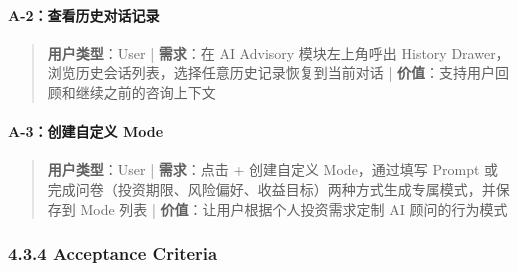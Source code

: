 
\paragraph{A-2：查看历史对话记录}

\begin{quote}\small \textbf{用户类型}：User | \textbf{需求}：在 AI Advisory 模块左上角呼出 History Drawer，浏览历史会话列表，选择任意历史记录恢复到当前对话 | \textbf{价值}：支持用户回顾和继续之前的咨询上下文\end{quote}


\paragraph{A-3：创建自定义 Mode}

\begin{quote}\small \textbf{用户类型}：User | \textbf{需求}：点击 + 创建自定义 Mode，通过填写 Prompt 或完成问卷（投资期限、风险偏好、收益目标）两种方式生成专属模式，并保存到 Mode 列表 | \textbf{价值}：让用户根据个人投资需求定制 AI 顾问的行为模式\end{quote}


\subsubsection{4.3.4 Acceptance Criteria}

